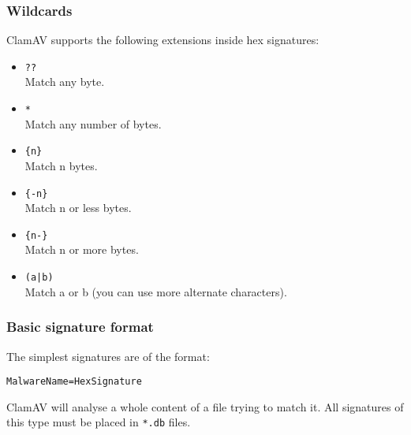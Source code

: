 \documentclass[a4paper,titlepage,12pt]{article}
\begin{document}
    \subsubsection{Wildcards}
    ClamAV supports the following extensions inside hex signatures:
    \begin{itemize}
	\item \verb+??+\\
	Match any byte.
	\item \verb+*+\\
	Match any number of bytes.
	\item \verb+{n}+\\
	Match n bytes.
	\item \verb+{-n}+\\
	Match n or less bytes.
	\item \verb+{n-}+\\
	Match n or more bytes.
	\item \verb+(a|b)+\\
	Match a or b (you can use more alternate characters).
    \end{itemize}

    \subsubsection{Basic signature format}
    The simplest signatures are of the format:
    \begin{verbatim}
MalwareName=HexSignature
    \end{verbatim}
    ClamAV will analyse a whole content of a file trying to match it. All
    signatures of this type must be placed in \verb+*.db+ files.
\end{document}
